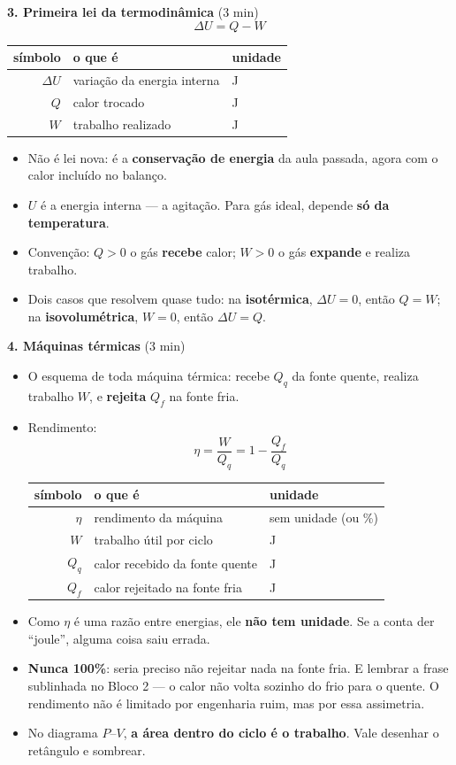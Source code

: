 \documentclass[11pt,a4paper]{article}
\makeatletter
\newcommand{\variaveis}[1]{%
  \begingroup\footnotesize
  \setlength{\tabcolsep}{6pt}
  \renewcommand{\arraystretch}{1.15}
  \begin{center}
  \begin{tabular}{@{}rll@{}}
    \toprule
    \textbf{s\'imbolo} & \textbf{o que \'e} & \textbf{unidade} \\
    \midrule
    #1
    \bottomrule
  \end{tabular}
  \end{center}
  \endgroup}
\makeatother
\begin{document}
\begin{quadro}
\medskip
\textbf{3. Primeira lei da termodin\^amica} (3 min)
\[
  \boxed{\Delta U = Q - W}
\]
\variaveis{
  $\Delta U$ & varia\c{c}\~ao da energia interna & J \\
  $Q$        & calor trocado                     & J \\
  $W$        & trabalho realizado                & J \\
}
\begin{itemize}[nosep]
  \item N\~ao \'e lei nova: \'e a \textbf{conserva\c{c}\~ao de energia} da aula
        passada, agora com o calor inclu\'ido no balan\c{c}o.
  \item $U$ \'e a energia interna --- a agita\c{c}\~ao. Para g\'as ideal, depende
        \textbf{s\'o da temperatura}.
  \item Conven\c{c}\~ao: $Q > 0$ o g\'as \textbf{recebe} calor; $W > 0$ o g\'as
        \textbf{expande} e realiza trabalho.
  \item Dois casos que resolvem quase tudo: na \textbf{isot\'ermica},
        $\Delta U = 0$, ent\~ao $Q = W$; na \textbf{isovolum\'etrica},
        $W = 0$, ent\~ao $\Delta U = Q$.
\end{itemize}

\medskip
\textbf{4. M\'aquinas t\'ermicas} (3 min)
\begin{itemize}[nosep]
  \item O esquema de toda m\'aquina t\'ermica: recebe $Q_q$ da fonte quente,
        realiza trabalho $W$, e \textbf{rejeita} $Q_f$ na fonte fria.
  \item Rendimento:
  \[
    \boxed{\eta = \frac{W}{Q_q} = 1 - \frac{Q_f}{Q_q}}
  \]
  \variaveis{
    $\eta$   & rendimento da m\'aquina        & sem unidade (ou \%) \\
    $W$      & trabalho \'util por ciclo      & J \\
    $Q_q$    & calor recebido da fonte quente & J \\
    $Q_f$    & calor rejeitado na fonte fria  & J \\
  }
  \item Como $\eta$ \'e uma raz\~ao entre energias, ele \textbf{n\~ao tem
        unidade}. Se a conta der ``joule'', alguma coisa saiu errada.
  \item \textbf{Nunca 100\%}: seria preciso n\~ao rejeitar nada na fonte
        fria. E lembrar a frase sublinhada no Bloco 2 --- o calor n\~ao
        volta sozinho do frio para o quente. O rendimento n\~ao \'e limitado
        por engenharia ruim, mas por essa assimetria.
  \item No diagrama $P$--$V$, \textbf{a \'area dentro do ciclo \'e o
        trabalho}. Vale desenhar o ret\^angulo e sombrear.
\end{itemize}
\end{quadro}
\end{document}
